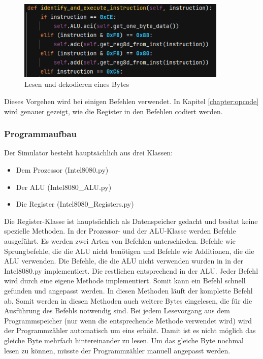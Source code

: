 \documentclass[12pt]{article}
\begin{document}
\begin{figure}[h]
\centering
\includegraphics[width=10cm]{Bilder/ReadInstruction}
\caption{Lesen und dekodieren eines Bytes}
\label{fig:ReadInstruction}
\end{figure}

\noindent
Dieses Vorgehen wird bei einigen Befehlen verwendet. In Kapitel \ref{chapter:opcode} wird genauer gezeigt, wie die Register in den Befehlen codiert werden.


\subsubsection{Programmaufbau}
\label{chapter:MPS_aufbau}

Der Simulator besteht hauptsächlich aus drei Klassen:

\begin{itemize}
\item Dem Prozessor (Intel8080.py)
\item Der ALU (Intel8080\_ALU.py)
\item Die Register (Intel8080\_Registers.py)
\end{itemize} 

\noindent
Die Register-Klasse ist hauptsächlich als Datenspeicher gedacht und besitzt keine spezielle Methoden. In der Prozessor- und der ALU-Klasse werden Befehle ausgeführt. Es werden zwei Arten von Befehlen unterschieden. Befehle wie Sprungbefehle, die die ALU nicht benötigen und Befehle wie Additionen, die die ALU verwenden. 
Die Befehle, die die ALU nicht verwenden wurden in in der Intel8080.py implementiert. Die restlichen entsprechend in der ALU. Jeder Befehl wird durch eine eigene Methode implementiert. Somit kann ein Befehl schnell gefunden und angepasst werden. In diesen Methoden läuft der komplette Befehl ab. Somit werden in diesen Methoden auch weitere Bytes eingelesen, die für die Ausführung des Befehls notwendig sind.
Bei jedem Lesevorgang aus dem Programmspeicher (nur wenn die entsprechende Methode verwendet wird) wird der Programmzähler automatisch um eins erhöht. Damit ist es nicht möglich das gleiche Byte mehrfach hintereinander zu lesen. Um das gleiche Byte nochmal lesen zu können, müsste der Programmzähler manuell angepasst werden.
\end{document}
